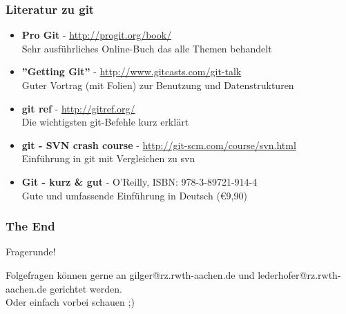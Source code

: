 \begin{frame}
  \frametitle{Literatur zu git}
  \begin{itemize}
    \item {\bf Pro Git} - \url{http://progit.org/book/} \\ Sehr ausführliches Online-Buch das alle Themen behandelt
    \item {\bf ''Getting Git''} - \url{http://www.gitcasts.com/git-talk} \\ Guter Vortrag (mit Folien) zur Benutzung und Datenstrukturen
    \item {\bf git ref} - \url{http://gitref.org/} \\ Die wichtigsten git-Befehle kurz erklärt
    \item {\bf git - SVN crash course} - \url{http://git-scm.com/course/svn.html} \\ Einführung in git mit Vergleichen zu svn
    \item {\bf Git - kurz \& gut} - O'Reilly, ISBN: 978-3-89721-914-4 \\ Gute und umfassende Einführung in Deutsch (\euro{9,90}) 
  \end{itemize}
\end{frame}

\begin{frame}
  \frametitle{The End}
  \begin{center}
  \Huge Fragerunde!
  \vspace{1.5cm}

  \small Folgefragen können gerne an gilger@rz.rwth-aachen.de und lederhofer@rz.rwth-aachen.de gerichtet werden. \\
  Oder einfach vorbei schauen ;)
  \end{center}
\end{frame}


